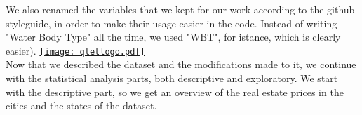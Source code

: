 We also renamed the variables that we kept for our work according to the github styleguide, in order to make their usage easier in the code. Instead of writing "Water Body Type" all the time, we used "WBT", for istance, which is clearly easier). \href{https://github.com/arminecseri/SPL-SOSE-17/blob/master/renameingvariables.R}{\texttt{[image: qletlogo.pdf]}}\\


Now that we described the dataset and the modifications made to it, we continue with the statistical analysis parts, both descriptive and exploratory. We start with the descriptive part, so we get an overview of the real estate prices in the cities and the states of the dataset.\\



